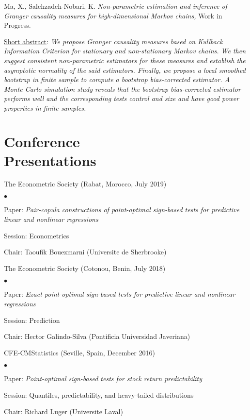 \documentclass[margin,line,pifont,palatino,courier]{res}
\newenvironment{list2}{
  \begin{list}{$\bullet$}{%
      \setlength{\itemsep}{0in}
      \setlength{\parsep}{0in} \setlength{\parskip}{0in}
      \setlength{\topsep}{0in} \setlength{\partopsep}{0in}
      \setlength{\leftmargin}{0.2in}}}{\end{list}}
\begin{document}
\begin{resume}
\vspace{+4ex}
Ma, X., Salehzadeh-Nobari, K. \emph{Non-parametric estimation and inference of Granger causality measures for high-dimensional Markov chains,} Work in Progress.

\underline{Short abstract}: \emph{We propose Granger causality measures based on Kullback Information Criterion for stationary and non-stationary Markov chains. We then suggest consistent non-parametric estimators for these measures and establish the asymptotic normality of the said estimators. Finally, we propose a local smoothed bootstrap in finite sample to compute a bootstrap bias-corrected estimator. A Monte Carlo simulation study reveals that the bootstrap bias-corrected estimator performs well and the corresponding tests control and size and have good power properties in finite samples.}

\hrulefill

\section{\sc \textbf{Conference \\ Presentations}}

The Econometric Society (Rabat, Morocco, July 2019)\\
\begin{list2}
\item Paper: \emph{Pair-copula constructions of point-optimal sign-based tests for predictive linear and nonlinear regressions}
\item Session: Econometrics
\item Chair: Taoufik Bouezmarni (Universite de Sherbrooke)
\end{list2} 

The Econometric Society (Cotonou, Benin, July 2018)\\
\begin{list2}
\item Paper: \emph{Exact point-optimal sign-based tests for predictive linear and nonlinear regressions}
\item Session: Prediction
\item Chair: Hector Galindo-Silva (Pontificia Universidad Javeriana)
\end{list2}


CFE-CMStatistics (Seville, Spain, December 2016)\\
\begin{list2}
\item Paper: \emph{Point-optimal sign-based tests for stock return predictability}
\item Session: Quantiles, predictability, and heavy-tailed distributions
\item Chair: Richard Luger (Universite Laval)
\end{list2}


\end{resume}
\end{document}

